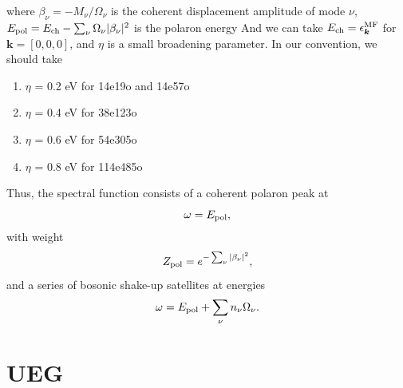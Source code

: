 where $\beta_\nu = -M_\nu / \Omega_\nu$ is the coherent displacement amplitude of mode $\nu$, $E_{\rm pol} = E_{\rm ch} - \sum_\nu \Omega_\nu |\beta_\nu|^2$ is the polaron energy And we can take $E_{\rm ch} = \epsilon^{\text{MF}}_{\bm{k}}$ for $\bm{k}=[0,0,0]$, and $\eta$ is a small broadening parameter. In our convention, we should take 
\begin{enumerate}
    \item $\eta$ = 0.2 eV for 14e19o and 14e57o
    \item $\eta$ = 0.4 eV for 38e123o
    \item $\eta$ = 0.6 eV for 54e305o
    \item $\eta$ = 0.8 eV for 114e485o
\end{enumerate}
\begin{tcolorbox}[colback=blue!5!white,colframe=blue!75!black,title=Physical intuition]
Thus, the spectral function consists of a coherent polaron peak at
\begin{equation}
\omega = E_{\rm pol},
\end{equation}
with weight
\begin{equation}
Z_{\rm pol}
=
e^{-\sum_\nu |\beta_\nu|^2},
\end{equation}
and a series of bosonic shake-up satellites at energies
\begin{equation}
\omega
=
E_{\rm pol}
+
\sum_\nu n_\nu \Omega_\nu .
\end{equation}

\end{tcolorbox}

\section{UEG}
